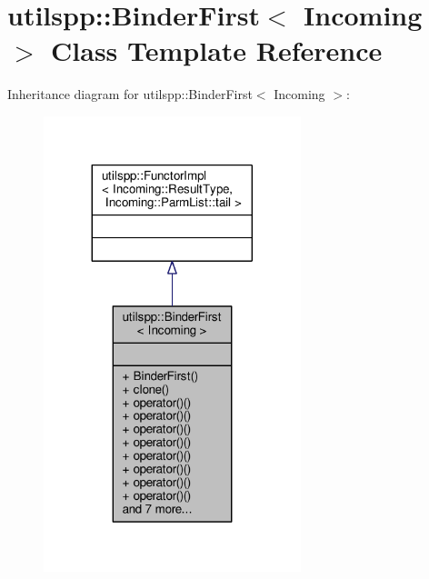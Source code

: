 \hypertarget{classutilspp_1_1BinderFirst}{\section{utilspp\-:\-:Binder\-First$<$ Incoming $>$ Class Template Reference}
\label{classutilspp_1_1BinderFirst}
}


Inheritance diagram for utilspp\-:\-:Binder\-First$<$ Incoming $>$\-:\nopagebreak
\begin{figure}[H]
\begin{center}
\leavevmode
\includegraphics[width=212pt]{classutilspp_1_1BinderFirst__inherit__graph}
\end{center}
\end{figure}


